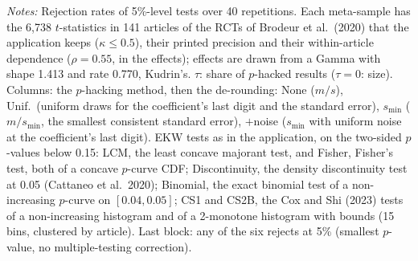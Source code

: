 \begin{table}[htbp]
\begin{minipage}{\linewidth}\footnotesize\textit{Notes:} Rejection rates of 5\%-level tests over 40 repetitions. Each meta-sample has the 6{,}738 $t$-statistics in 141 articles of the RCTs of Brodeur et al.\ (2020) that the application keeps ($\kappa \le 0.5$), their printed precision and their within-article dependence ($\rho = 0.55$, in the effects); effects are drawn from a Gamma with shape 1.413 and rate 0.770, Kudrin's. $\tau$: share of $p$-hacked results ($\tau = 0$: size). Columns: the $p$-hacking method, then the de-rounding: None ($m/s$), Unif.\ (uniform draws for the coefficient's last digit and the standard error), $s_{\min}$ ($m/s_{\min}$, the smallest consistent standard error), $+$noise ($s_{\min}$ with uniform noise at the coefficient's last digit). EKW tests as in the application, on the two-sided $p$-values below 0.15: LCM, the least concave majorant test, and Fisher, Fisher's test, both of a concave $p$-curve CDF; Discontinuity, the density discontinuity test at 0.05 (Cattaneo et al.\ 2020); Binomial, the exact binomial test of a non-increasing $p$-curve on $[0.04, 0.05]$; CS1 and CS2B, the Cox and Shi (2023) tests of a non-increasing histogram and of a 2-monotone histogram with bounds (15 bins, clustered by article). Last block: any of the six rejects at 5\% (smallest $p$-value, no multiple-testing correction).\end{minipage}
\end{table}
